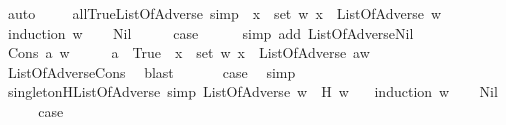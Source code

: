 \begin{isabellebody}
\ auto\ \isanewline
{}\isamarkupfalse%
%
\endisatagproof
{\isafoldproof}%
%
\isadelimproof
\isanewline
%
\endisadelimproof
\ \ \isanewline
{}\isamarkupfalse%
\ all{\isacharunderscore}True{\isacharunderscore}ListOfAdverse\ {\isacharbrackleft}simp{\isacharbrackright}{\isacharcolon}\ {\isachardoublequoteopen}{\isacharparenleft}{\isasymforall}\ x\ {\isasymin}\ set\ w{\isachardot}\ x{\isacharparenright}\ {\isasymlongrightarrow}\ ListOfAdverse\ w{\isachardoublequoteclose}\isanewline
%
\isadelimproof
%
\endisadelimproof
%
\isatagproof
{}\isamarkupfalse%
\ {\isacharparenleft}induction\ w{\isacharparenright}\isanewline
\ \ \isamarkupfalse%
\ Nil\isanewline
\ \ \isamarkupfalse%
\ \isamarkupfalse%
\ {\isacharquery}case\isanewline
\ \ \ \ \isamarkupfalse%
\ {\isacharparenleft}simp\ add{\isacharcolon}\ ListOfAdverse{\isachardot}Nil{\isacharparenright}\ \isanewline
{}\isamarkupfalse%
\isanewline
\ \ \isamarkupfalse%
\ {\isacharparenleft}Cons\ a\ w{\isacharparenright}\isanewline
\ \ \isamarkupfalse%
\ \isamarkupfalse%
\ {\isachardoublequoteopen}a\ {\isacharequal}\ True\ {\isasymand}\ {\isacharparenleft}{\isasymforall}x\ {\isasymin}\ set\ w{\isachardot}\ x{\isacharparenright}\ {\isasymlongrightarrow}\ ListOfAdverse\ {\isacharparenleft}a{\isacharhash}w{\isacharparenright}{\isachardoublequoteclose}\isanewline
\ \ \ \ \isamarkupfalse%
\ ListOfAdverse{\isachardot}Cons\ \isamarkupfalse%
\ blast\ \isanewline
\ \ \isamarkupfalse%
\ \isamarkupfalse%
\ {\isacharquery}case\ \isamarkupfalse%
\ simp\isanewline
{}\isamarkupfalse%
%
\endisatagproof
{\isafoldproof}%
%
\isadelimproof
\isanewline
%
\endisadelimproof
\ \ \isanewline
{}\isamarkupfalse%
\ singleton{\isacharunderscore}H{\isacharunderscore}ListOfAdverse\ {\isacharbrackleft}simp{\isacharbrackright}{\isacharcolon}\ {\isachardoublequoteopen}ListOfAdverse\ w\ {\isasymlongrightarrow}\ H\ w\ {\isacharequal}\ {\isacharbraceleft}{}{\isacharbraceright}{\isachardoublequoteclose}\isanewline
%
\isadelimproof
%
\endisadelimproof
%
\isatagproof
{}\isamarkupfalse%
\ {\isacharparenleft}induction\ w{\isacharparenright}\isanewline
\ \ \isamarkupfalse%
\ Nil\isanewline
\ \ \isamarkupfalse%
\ \isamarkupfalse%
\ {\isacharquery}case\isanewline
\ \ \ \ \isamarkupfalse%

\end{isabellebody}
